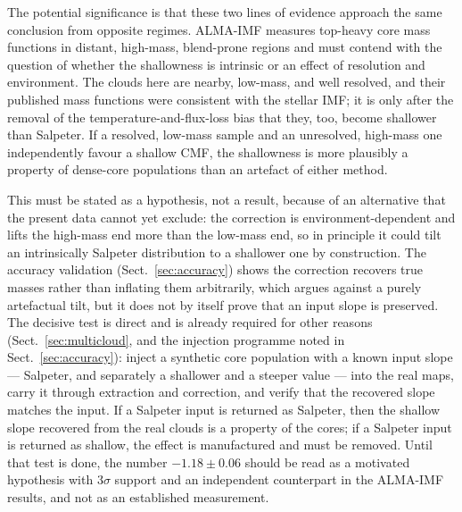 \documentclass[11pt,a4paper]{article}
\begin{document}
The potential significance is that these two lines of evidence approach the
same conclusion from opposite regimes. ALMA-IMF measures top-heavy core mass
functions in distant, high-mass, blend-prone regions and must contend with the
question of whether the shallowness is intrinsic or an effect of resolution and
environment. The clouds here are nearby, low-mass, and well resolved, and their
published mass functions were consistent with the stellar IMF; it is only after
the removal of the temperature-and-flux-loss bias that they, too, become
shallower than Salpeter. If a resolved, low-mass sample and an unresolved,
high-mass one independently favour a shallow CMF, the shallowness is more
plausibly a property of dense-core populations than an artefact of either
method.

This must be stated as a hypothesis, not a result, because of an alternative
that the present data cannot yet exclude: the correction is
environment-dependent and lifts the high-mass end more than the low-mass end,
so in principle it could tilt an intrinsically Salpeter distribution to a
shallower one by construction. The accuracy validation
(Sect.~\ref{sec:accuracy}) shows the correction recovers true masses rather
than inflating them arbitrarily, which argues against a purely artefactual
tilt, but it does not by itself prove that an input slope is preserved. The
decisive test is direct and is already required for other reasons
(Sect.~\ref{sec:multicloud}, and the injection programme noted in
Sect.~\ref{sec:accuracy}): inject a synthetic core population with a known
input slope --- Salpeter, and separately a shallower and a steeper value ---
into the real maps, carry it through extraction and correction, and verify that
the recovered slope matches the input. If a Salpeter input is returned as
Salpeter, then the shallow slope recovered from the real clouds is a property
of the cores; if a Salpeter input is returned as shallow, the effect is
manufactured and must be removed. Until that test is done, the number
$-1.18\pm0.06$ should be read as a motivated hypothesis with $3\sigma$
support and an independent counterpart in the ALMA-IMF results, and not as an
established measurement.
\end{document}
